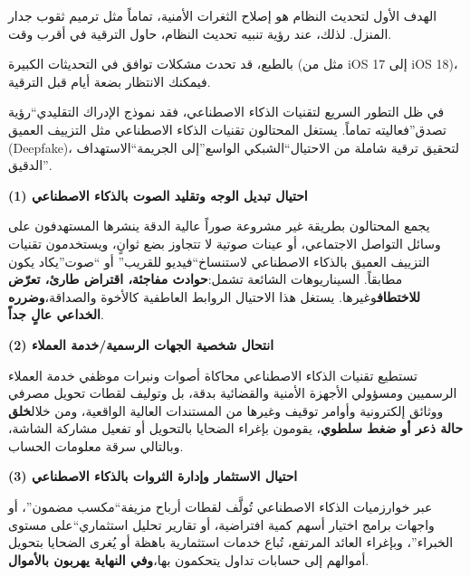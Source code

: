 
الهدف الأول لتحديث النظام هو إصلاح الثغرات الأمنية، تماماً مثل ترميم ثقوب جدار المنزل. لذلك، عند رؤية تنبيه تحديث النظام، حاول الترقية في أقرب وقت.

بالطبع، قد تحدث مشكلات توافق في التحديثات الكبيرة (مثل من iOS 17 إلى iOS 18)، فيمكنك الانتظار بضعة أيام قبل الترقية.


في ظل التطور السريع لتقنيات الذكاء الاصطناعي، فقد نموذج الإدراك التقليدي“رؤية تصدق”فعاليته تماماً. يستغل المحتالون تقنيات الذكاء الاصطناعي مثل التزييف العميق (Deepfake)، لتحقيق ترقية شاملة من الاحتيال“الشبكي الواسع”إلى الجريمة“الاستهداف الدقيق”.


\textbf{(1) احتيال تبديل الوجه وتقليد الصوت بالذكاء الاصطناعي}\par

يجمع المحتالون بطريقة غير مشروعة صوراً عالية الدقة ينشرها المستهدفون على وسائل التواصل الاجتماعي، أو عينات صوتية لا تتجاوز بضع ثوانٍ، ويستخدمون تقنيات التزييف العميق بالذكاء الاصطناعي لاستنساخ“فيديو للقريب” أو “صوت”يكاد يكون مطابقاً. السيناريوهات الشائعة تشمل:\textbf{حوادث مفاجئة، اقتراض طارئ، تعرّض للاختطاف}وغيرها. يستغل هذا الاحتيال الروابط العاطفية كالأخوة والصداقة،\textbf{وضرره الخداعي عالٍ جداً}.

\textbf{(2) انتحال شخصية الجهات الرسمية/خدمة العملاء}\par

تستطيع تقنيات الذكاء الاصطناعي محاكاة أصوات ونبرات موظفي خدمة العملاء الرسميين ومسؤولي الأجهزة الأمنية والقضائية بدقة، بل وتوليف لقطات تحويل مصرفي ووثائق إلكترونية وأوامر توقيف وغيرها من المستندات العالية الواقعية، ومن خلال\textbf{خلق حالة ذعر أو ضغط سلطوي}، يقومون بإغراء الضحايا بالتحويل أو تفعيل مشاركة الشاشة، وبالتالي سرقة معلومات الحساب.

\textbf{(3) احتيال الاستثمار وإدارة الثروات بالذكاء الاصطناعي}\par

عبر خوارزميات الذكاء الاصطناعي تُولَّف لقطات أرباح مزيفة“مكسب مضمون”، أو واجهات برامج اختيار أسهم كمية افتراضية، أو تقارير تحليل استثماري“على مستوى الخبراء”، وبإغراء العائد المرتفع، تُباع خدمات استثمارية باهظة أو يُغرى الضحايا بتحويل أموالهم إلى حسابات تداول يتحكمون بها،\textbf{وفي النهاية يهربون بالأموال}.


